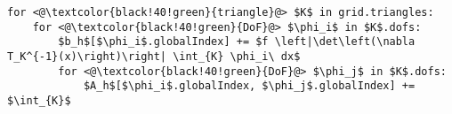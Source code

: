 \documentclass{article}
\begin{document}
\pagestyle{plain}
\lstset{language=Python}
\begin{lstlisting}[mathescape=true]
for <@\textcolor{black!40!green}{triangle}@> $K$ in grid.triangles:
	for <@\textcolor{black!40!green}{DoF}@> $\phi_i$ in $K$.dofs:
		$b_h$[$\phi_i$.globalIndex] += $f \left|\det\left(\nabla T_K^{-1}(x)\right)\right| \int_{K} \phi_i\ dx$
		for <@\textcolor{black!40!green}{DoF}@> $\phi_j$ in $K$.dofs:
			$A_h$[$\phi_i$.globalIndex, $\phi_j$.globalIndex] += $\int_{K}$
\end{lstlisting}
\end{document}
